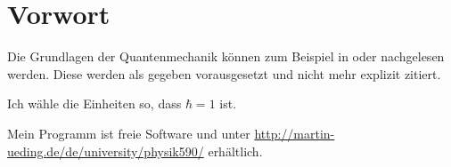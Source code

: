 
\chapter*{Vorwort}

Die Grundlagen der Quantenmechanik können zum Beispiel in
\parencite{Schwabl/Quantenmechanik} oder \parencite{nolting-theo5} nachgelesen
werden. Diese werden als gegeben vorausgesetzt und nicht mehr explizit zitiert.

Ich wähle die Einheiten so, dass $\hbar = 1$ ist.

Mein Programm ist freie Software und unter
\url{http://martin-ueding.de/de/university/physik590/} erhältlich.

